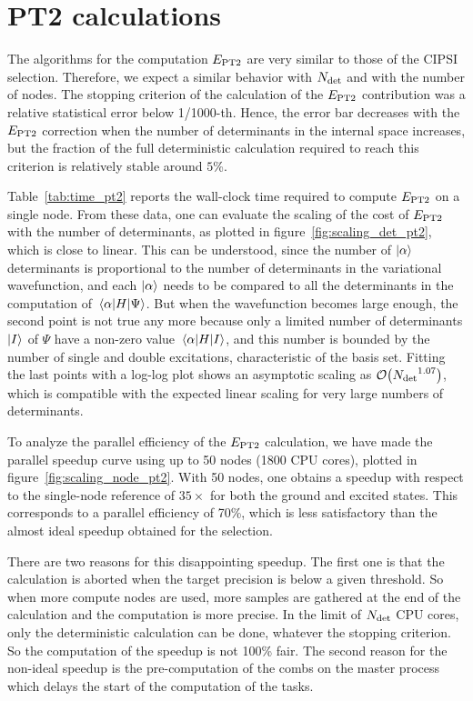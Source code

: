 \documentclass[./thesis.tex]{subfiles}
\begin{document}
\clearpage

\section{PT2 calculations}

The algorithms for the computation $E_\text{PT2}$ are very similar to those of the CIPSI selection. Therefore, we expect a similar behavior with ${N_\text{det}}$ and with the number of nodes.
The stopping criterion of the calculation of the $E_\text{PT2}$ contribution was a
relative statistical error below 1/1000-th. Hence, the error bar decreases with
the $E_\text{PT2}$ correction when the number of determinants in the internal space
increases, but the fraction of the full deterministic calculation required to
reach this criterion is relatively stable around $5$\%.

Table~\ref{tab:time_pt2} reports the wall-clock time required to compute $E_\text{PT2}$
on a single node.
From these data, one can evaluate the scaling of the cost of $E_\text{PT2}$ 
with the number of determinants, as plotted in figure~\ref{fig:scaling_det_pt2},
which is close to linear.
This can be understood, since 
the number of $\ket{\alpha}$ determinants is proportional to the
number of determinants in the variational wavefunction, and each
$\ket{\alpha}$ needs to be compared to all the determinants 
in the computation of $\mel{\alpha}{H}{\Psi}$.
But when the wavefunction becomes large enough, the second point is not true any more because only a limited number of determinants $\ket{I}$ of $\Psi$ have a non-zero
value $\mel{\alpha}{H}{I}$, and this number is bounded by the number of single and double excitations, characteristic of the basis set.
Fitting the last points with a log-log plot shows an asymptotic scaling as
$\order{\Ndet^{1.07}}$, which is compatible with the expected linear scaling for
very large numbers of determinants.

To analyze the parallel efficiency of the $E_\text{PT2}$ calculation, we have made the parallel speedup curve using up to 50 nodes (1800 CPU cores), plotted in figure~\ref{fig:scaling_node_pt2}. With 50 nodes, one obtains a speedup with respect to the single-node reference of $35\times$ for both the ground and excited states. This corresponds to a parallel efficiency of 70\%, which is less satisfactory than the almost ideal speedup obtained for the selection.

There are two reasons for this disappointing speedup. The first one is that the calculation is aborted when the target precision is below a given threshold. So when more compute nodes are used, more samples are gathered at the end of the calculation and the computation is more precise. In the limit of ${N_\text{det}}$ CPU cores, only the deterministic calculation can be done, whatever the stopping criterion. So the computation of the speedup is not 100\% fair.
The second reason for the non-ideal speedup is the pre-computation of the combs on the master process which delays the start of the computation of the tasks.
\end{document}
